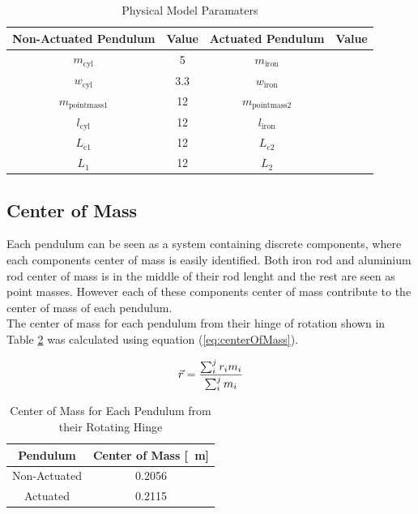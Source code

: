 \begin{table}[]
	\centering
	\begin{tabular}{|c|c|c|c|}
		\hline
		Non-Actuated Pendulum& Value & Actuated Pendulum & Value \\
		\hline
		\hline
		$m_{\text{cyl}}$ & \SI{5}{} & $m_{\text{iron}}$ &\\
		\hline
		$w_{\text{cyl}}$ & \SI{3.3}{}& $w_{\text{iron}}$& \\
		\hline
		$m_{\text{pointmass1}}$ & \SI{12}{}& $m_{\text{pointmass2}}$& \\
		\hline
		$l_{\text{cyl}}$ & \SI{12}{}& $l_{\text{iron}}$& \\
		\hline
		$L_{\text{c1}}$ & \SI{12}{} & $L_{\text{c2}}$&\\
		\hline
		$L_{1}$ & \SI{12}{}& $L_{2}$& \\
		\hline
	\end{tabular}
	\caption{Physical Model Paramaters}
	\label{table:model_param}
\end{table}

\subsection{Center of Mass}
Each pendulum can be seen as a system containing discrete components, where each components center of mass is easily identified. Both iron rod and aluminium rod center of mass is in the middle of their rod lenght and the rest are seen as point masses. However each of these components center of mass contribute to the center of mass of each pendulum.\\

The center of mass for each pendulum from their hinge of rotation shown in Table \ref{table:centerOfMass} was calculated using equation (\ref{eq:centerOfMass}).

\begin{equation} \label{eq:centerOfMass}
\vec{\boldmath{r}} = \frac{\sum_{i}^{j}r_{i}m_{i}}{\sum_{i}^{j}m_{i}}
\end{equation}

\begin{table}[]
	\centering
	\begin{tabular}{|c|c|}
		\hline
		Pendulum & Center of Mass [\SI{}{m}] \\
		\hline
		\hline
		Non-Actuated  & \SI{0.2056}{} \\
		\hline
		Actuated  & \SI{0.2115}{} \\
		\hline
	\end{tabular}
	\caption{Center of Mass for Each Pendulum from their Rotating Hinge}
	\label{table:centerOfMass}
\end{table}


